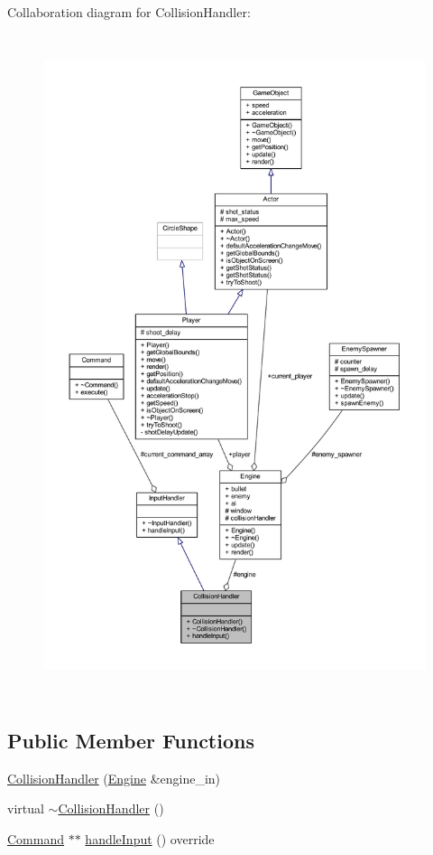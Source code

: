 Collaboration diagram for Collision\+Handler\+:
\nopagebreak
\begin{figure}[H]
\begin{center}
\leavevmode
\includegraphics[height=550pt]{class_collision_handler__coll__graph}
\end{center}
\end{figure}
\subsection*{Public Member Functions}
\begin{DoxyCompactItemize}
\item 
\hyperlink{class_collision_handler_a1d575178fc7de4a35e9f0abb1f7f6395}{Collision\+Handler} (\hyperlink{class_engine}{Engine} \&engine\+\_\+in)
\item 
virtual \hyperlink{class_collision_handler_a99f5524cf1706f9ea95500cf273a9d97}{$\sim$\+Collision\+Handler} ()
\item 
\hyperlink{class_command}{Command} $\ast$$\ast$ \hyperlink{class_collision_handler_a7f6deb84dcebcc72e0020eb251ea617f}{handle\+Input} () override
\end{DoxyCompactItemize}
